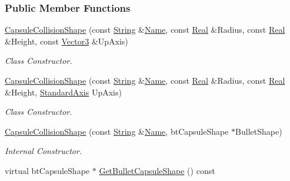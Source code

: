 \subsubsection*{Public Member Functions}
\begin{DoxyCompactItemize}
\item 
\hyperlink{classMezzanine_1_1CapsuleCollisionShape_a8709e48065ef7698506c9854d41afe8e}{CapsuleCollisionShape} (const \hyperlink{namespaceMezzanine_acf9fcc130e6ebf08e3d8491aebcf1c86}{String} \&\hyperlink{classMezzanine_1_1CollisionShape_aac524c5c56fa4d158bc071f8aecfbe79}{Name}, const \hyperlink{namespaceMezzanine_a726731b1a7df72bf3583e4a97282c6f6}{Real} \&Radius, const \hyperlink{namespaceMezzanine_a726731b1a7df72bf3583e4a97282c6f6}{Real} \&Height, const \hyperlink{classMezzanine_1_1Vector3}{Vector3} \&UpAxis)
\begin{DoxyCompactList}\small\item\em Class Constructor. \item\end{DoxyCompactList}\item 
\hyperlink{classMezzanine_1_1CapsuleCollisionShape_abe6eb6dffc5f40d424974b4f0801cf28}{CapsuleCollisionShape} (const \hyperlink{namespaceMezzanine_acf9fcc130e6ebf08e3d8491aebcf1c86}{String} \&\hyperlink{classMezzanine_1_1CollisionShape_aac524c5c56fa4d158bc071f8aecfbe79}{Name}, const \hyperlink{namespaceMezzanine_a726731b1a7df72bf3583e4a97282c6f6}{Real} \&Radius, const \hyperlink{namespaceMezzanine_a726731b1a7df72bf3583e4a97282c6f6}{Real} \&Height, \hyperlink{namespaceMezzanine_ab41a00a8c6a47b576dc987ec34e16ba1}{StandardAxis} UpAxis)
\begin{DoxyCompactList}\small\item\em Class Constructor. \item\end{DoxyCompactList}\item 
\hyperlink{classMezzanine_1_1CapsuleCollisionShape_a5391a125678d98b509abc8f60cb475be}{CapsuleCollisionShape} (const \hyperlink{namespaceMezzanine_acf9fcc130e6ebf08e3d8491aebcf1c86}{String} \&\hyperlink{classMezzanine_1_1CollisionShape_aac524c5c56fa4d158bc071f8aecfbe79}{Name}, btCapsuleShape $\ast$BulletShape)
\begin{DoxyCompactList}\small\item\em Internal Constructor. \item\end{DoxyCompactList}\item 
virtual btCapsuleShape $\ast$ \hyperlink{classMezzanine_1_1CapsuleCollisionShape_ad9505b15fdcbd88231714992e5b3fc06}{GetBulletCapsuleShape} () const 

\end{DoxyCompactItemize}
